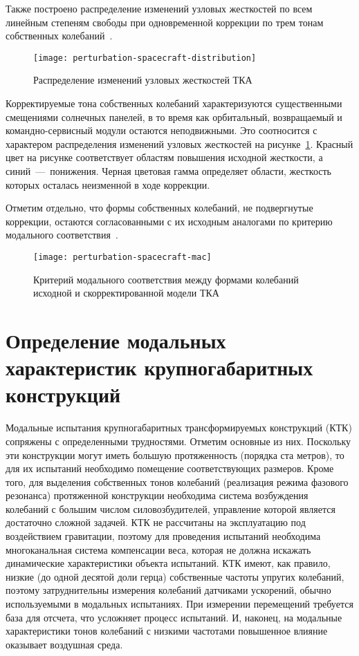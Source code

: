 Также построено распределение изменений узловых жесткостей по всем линейным степеням свободы при одновременной коррекции по трем тонам собственных колебаний~.

\begin{figure}[H]
	\centering
	\texttt{[image: perturbation-spacecraft-distribution]}
	\caption{Распределение изменений узловых жесткостей ТКА} \label{fig:perturbation-spacecraft-distribution}
\end{figure}

Корректируемые тона собственных колебаний характеризуются существенными смещениями солнечных панелей, в то время как орбитальный, возвращаемый и командно-сервисный модули остаются неподвижными. Это соотносится с характером распределения изменений узловых жесткостей на рисунке~\ref{fig:perturbation-spacecraft-distribution}. Красный цвет на рисунке соответствует областям повышения исходной жесткости, а синий~---~понижения. Черная цветовая гамма определяет области, жесткость которых осталась неизменной в ходе коррекции.

Отметим отдельно, что формы собственных колебаний, не подвергнутые коррекции, остаются согласованными с их исходным аналогами по критерию модального соответствия~.

\begin{figure}[!htb]
	\centering
	\texttt{[image: perturbation-spacecraft-mac]}
	\caption{Критерий модального соответствия между формами колебаний исходной и скорректированной модели ТКА} \label{fig:perturbation-spacecraft-mac}
\end{figure}

\section{Определение модальных характеристик крупногабаритных конструкций}

Модальные испытания крупногабаритных трансформируемых конструкций (КТК) сопряжены с определенными трудностями. Отметим основные из них. Поскольку эти конструкции могут иметь большую протяженность (порядка ста метров), то для их испытаний необходимо помещение соответствующих размеров. Кроме того, для выделения собственных тонов колебаний (реализация режима фазового резонанса) протяженной конструкции необходима система возбуждения колебаний с большим числом силовозбудителей, управление которой является достаточно сложной задачей. КТК не рассчитаны на эксплуатацию под воздействием гравитации, поэтому для проведения испытаний необходима многоканальная система компенсации веса, которая не должна искажать динамические характеристики объекта испытаний. КТК имеют, как правило, низкие (до одной десятой доли герца) собственные частоты упругих колебаний, поэтому затруднительны измерения колебаний датчиками ускорений, обычно используемыми в модальных испытаниях. При измерении перемещений требуется база для отсчета, что усложняет процесс испытаний. И, наконец, на модальные характеристики тонов колебаний с низкими частотами повышенное влияние оказывает воздушная среда. 


